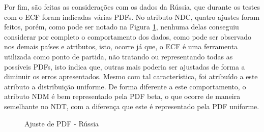 \documentclass[a4paper,12pt]{article}
\begin{document}
\newpage %

\par Por fim, são feitas as considerações com os dados da Rússia, que durante os testes com o ECF foram indicadas várias PDFs. No atributo NDC, quatro ajustes foram feitos, porém, como pode ser notado na Figura \ref{figure:pdf5}, nenhuma delas conseguiu considerar por completo o comportamento dos dados, como pode ser observado nos demais países e atributos, isto, ocorre já que, o ECF é uma ferramenta utilizada como ponto de partida, não tratando ou representando todas as possíveis PDFs, isto indica que, outras mais poderia ser ajustadas de forma a diminuir os erros apresentados. Mesmo com tal característica, foi atribuído a este atributo a distribuição uniforme. De forma diferente a este comportamento, o atributo NDM é bem representado pela PDF beta, o que ocorre de maneira semelhante no NDT, com a diferença que este é representado pela PDF uniforme.

\begin{figure}[H]
\captionsetup[subfigure]{labelformat=empty}
\centering
\caption{Ajuste de PDF - Rússia}
\qquad
{}
\qquad
{}
\label{figure:pdf5}
\end{figure}
\end{document}
